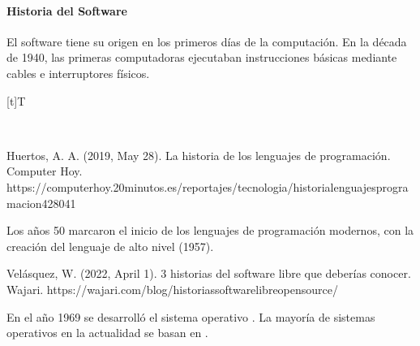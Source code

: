 \documentclass[letterpaper,10pt,spanish]{sphinxmanual}
\let\sphinxpxdimen\pdfpxdimen\else\newdimen\sphinxpxdimen
\begin{document}
\paragraph{Historia del Software}
\label{\detokenize{cursos/informatica10/recursos/T01:historia-del-software}}
\sphinxAtStartPar
El software tiene su origen en los primeros días de la computación. En la década de 1940, las primeras computadoras ejecutaban instrucciones básicas mediante cables e interruptores físicos.


\begin{savenotes}\sphinxattablestart
\sphinxthistablewithglobalstyle
\centering
\begin{tabulary}{\linewidth}[t]{T}
\sphinxtoprule
\sphinxtableatstartofbodyhook

\begin{sphinxfigure-in-table}
\centering
\capstart
\noindent\sphinxincludegraphics[width=600\sphinxpxdimen]{{image07}.png}
\label{\detokenize{cursos/informatica10/recursos/T01:id32}}\end{sphinxfigure-in-table}\relax
\\
\sphinxbottomrule
\end{tabulary}
\sphinxtableafterendhook\par
\sphinxattableend\end{savenotes}

\sphinxAtStartPar
%
\begin{footnote}[10]\sphinxAtStartFootnote
Huertos, A. A. (2019, May 28). La historia de los lenguajes de programación. Computer Hoy. https://computerhoy.20minutos.es/reportajes/tecnologia/historia\sphinxhyphen{}lenguajes\sphinxhyphen{}programacion\sphinxhyphen{}428041
%
\end{footnote} Los años 50 marcaron el inicio de los lenguajes de programación modernos, con la creación del lenguaje de alto nivel  (1957).

\sphinxAtStartPar
%
\begin{footnote}[11]\sphinxAtStartFootnote
Velásquez, W. (2022, April 1). 3 historias del software libre que deberías conocer. Wajari. https://wajari.com/blog/historias\sphinxhyphen{}software\sphinxhyphen{}libre\sphinxhyphen{}open\sphinxhyphen{}source/
%
\end{footnote} En el año 1969 se desarrolló el sistema operativo . La mayoría de sistemas operativos en la actualidad se basan en .
\end{document}
